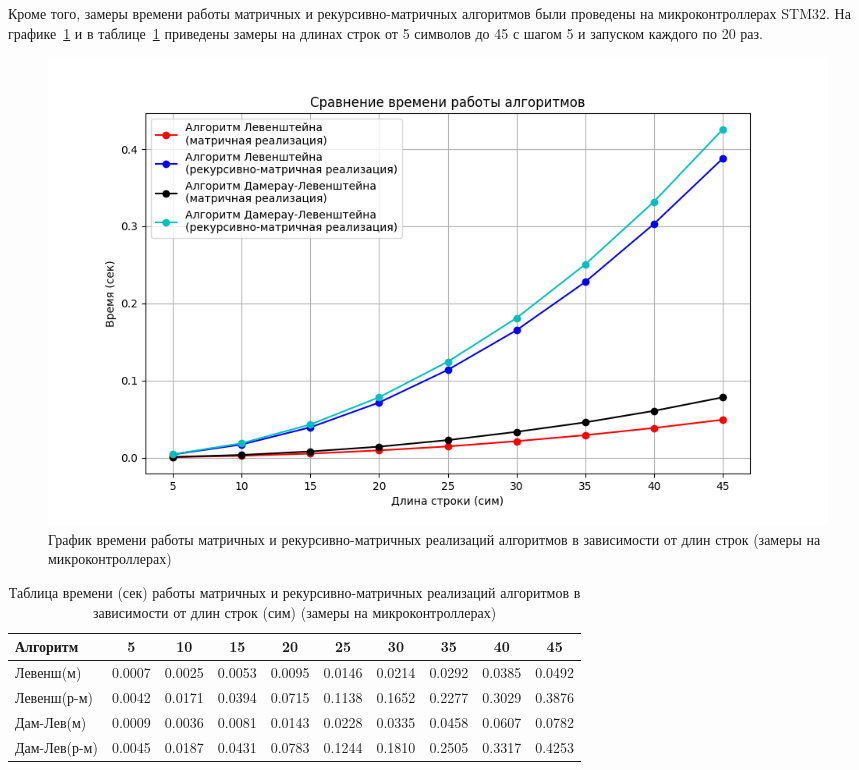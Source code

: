 Кроме того, замеры времени работы матричных и рекурсивно-матричных алгоритмов были проведены на микроконтроллерах STM32. На графике~\ref{fig:graph_mat_rec-mat_micro} и в таблице~\ref{table:table_mat_rec-mat_micro} приведены замеры на длинах строк от 5 символов до 45 с шагом 5 и запуском каждого по 20 раз.

\begin{figure}[H]
    \centering
    \includegraphics[width=1\textwidth]{img/graph_mat_rec-mat_micro.png}
    \caption{График времени работы матричных и рекурсивно-матричных реализаций алгоритмов в зависимости от длин строк (замеры на микроконтроллерах)}
    \label{fig:graph_mat_rec-mat_micro} %
\end{figure}

\begin{table}[H]
    \centering
    \caption{Таблица времени (сек) работы матричных и рекурсивно-матричных реализаций алгоритмов в зависимости от длин строк (сим) (замеры на микроконтроллерах)}
    \begin{tabular}{|l|c|c|c|c|c|c|c|c|c|}
        \hline
        \textbf{Алгоритм} & \textbf{5} & \textbf{10} & \textbf{15} & \textbf{20} & \textbf{25} & \textbf{30} & \textbf{35} & \textbf{40} & \textbf{45} \\
        \hline
        Левенш(м) & 0.0007 & 0.0025 & 0.0053 & 0.0095 & 0.0146 & 0.0214 & 0.0292 & 0.0385 & 0.0492 \\
        Левенш(р-м) & 0.0042 & 0.0171 & 0.0394 & 0.0715 & 0.1138 & 0.1652 & 0.2277 & 0.3029 & 0.3876 \\
        Дам-Лев(м) & 0.0009 & 0.0036 & 0.0081 & 0.0143 & 0.0228 & 0.0335 & 0.0458 & 0.0607 & 0.0782 \\
        Дам-Лев(р-м) & 0.0045 & 0.0187 & 0.0431 & 0.0783 & 0.1244 & 0.1810 & 0.2505 & 0.3317 & 0.4253 \\
        \hline
    \end{tabular}
    \label{table:table_mat_rec-mat_micro}
\end{table}

